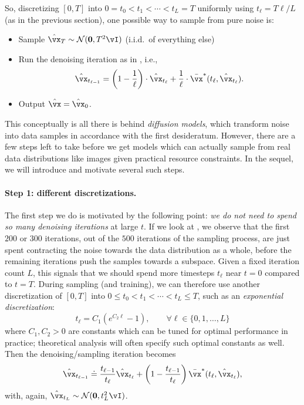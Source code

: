 \documentclass[../../book-main.tex]{subfiles}
\begin{document}
So, discretizing \([0, T]\) into \(0 = t_{0} < t_{1} < \cdots < t_{L} = T\) uniformly using \(t_{\ell} = T\ell / L\) (as in the previous section), one possible way to sample from pure noise is:
\begin{itemize}
	\item Sample \(\hat{\vx}_{T} \sim \dNorm(\vzero, T^{2}\vI)\) (i.i.d.~of everything else) 
	\item Run the denoising iteration as in , i.e.,
		\begin{equation}\label{eq:denoising-iteration-basic}
		\hat{\vx}_{t_{\ell - 1}} = \bp{1 - \frac{1}{\ell}}\cdot\hat{\vx}_{t_{\ell}} + \frac{1}{\ell}\cdot\bar{\vx}^{\ast}(t_{\ell}, \hat{\vx}_{t_{\ell}}).
	\end{equation}
	\item Output \(\hat{\vx} = \hat{\vx}_{0}\).
\end{itemize}
This conceptually is all there is behind \textit{diffusion models}, which transform noise into data samples in accordance with the first desideratum. However, there are a few steps left to take before we get models which can actually sample from real data distributions like images given practical resource constraints. In the sequel, we will introduce and motivate several such steps.

\paragraph{Step 1: different discretizations.} The first step we do is motivated by the following point: \textit{we do not need to spend so many denoising iterations} at large  \(t\). If we look at , we observe that the first \(200\) or \(300\) iterations, out of the \(500\) iterations of the sampling process, are just spent contracting the noise towards the data distribution as a whole, before the remaining iterations push the samples towards a subspace. Given a fixed iteration count \(L\), this signals that we should spend more timesteps \(t_{\ell}\) near \(t = 0\) compared to \(t = T\). During sampling (and training), we can therefore use another discretization of \([0, T]\) into \(0 \leq t_{0} < t_{1} < \cdots < t_{L} \leq T\), such as an \textit{exponential discretization}:
\begin{equation}\label{eq:denoising_exponential_discretization}
	t_{\ell} = C_{1}(e^{C_{2}\ell} - 1), \qquad \forall \ell \in \{0, 1, \dots, L\}
\end{equation}
where \(C_{1}, C_{2} > 0\) are constants which can be tuned for optimal performance in practice; theoretical analysis will often specify such optimal constants as well. Then the denoising/sampling iteration becomes 
\begin{equation}\label{eq:denoising_iteration}
	\hat{\vx}_{t_{\ell - 1}} \doteq \frac{t_{\ell - 1}}{t_{\ell}}\hat{\vx}_{t_{\ell}} + \bp{1 - \frac{t_{\ell - 1}}{t_{\ell}}}\bar{\vx}^{\ast}(t_{\ell}, \hat{\vx}_{t_{\ell}}),
\end{equation}
with, again, \(\hat{\vx}_{t_{L}} \sim \dNorm(\vzero, t_{L}^{2}\vI)\).
\end{document}
